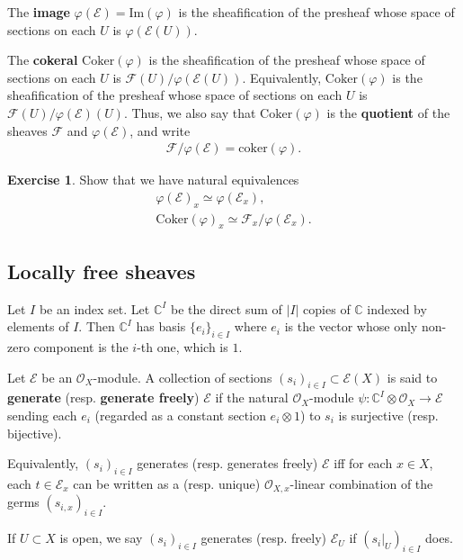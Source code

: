 \documentclass[12pt,a4paper,notitlepage]{article}
\theoremstyle{definition}
\newtheorem{exe}[df]{Exercise}
\theoremstyle{plain}
\newcommand{\scr}{\mathscr}
\newcommand{\coker}{\mathrm{coker}}
\newcommand{\Cbb}{\mathbb C}
\newcommand{\Coker}{\mathrm{Coker}}
\newcommand{\Imag}{\mathrm{Im}}
\numberwithin{equation}{section}
\begin{document}
The \textbf{image} $\varphi(\scr E)=\Imag(\varphi)$ is the sheafification of the presheaf whose space of sections on each $U$ is $\varphi(\scr E(U))$.


The \textbf{cokeral} $\Coker(\varphi)$ is the sheafification of the presheaf whose space of sections on each $U$ is $\scr F(U)/\varphi(\scr E(U))$. Equivalently, $\Coker(\varphi)$ is the sheafification of the presheaf whose space of sections on each $U$ is $\scr F(U)/\varphi(\scr E)(U)$. Thus, we also say that $\Coker(\varphi)$ is the \textbf{quotient} of the sheaves $\scr F$ and $\varphi(\scr E)$, and write
\begin{align}
\scr F/\varphi(\scr E)=\coker(\varphi).	
\end{align}



\begin{exe}
	Show that we have natural equivalences
	\begin{gather}
		\varphi(\scr E)_x\simeq\varphi(\scr E_x),\\
		\Coker(\varphi)_x	\simeq \scr F_x/\varphi(\scr E_x).
	\end{gather}
\end{exe}


\subsection{Locally free sheaves}


Let $I$ be an index set. Let $\Cbb^I$ be the direct sum of  $|I|$ copies of $\Cbb$ indexed by elements of $I$. Then $\Cbb^I$ has basis $\{e_i\}_{i\in I}$ where $e_i$ is the vector whose only non-zero component is the $i$-th one, which is $1$.

Let $\scr E$ be an $\scr O_X$-module. A collection of sections $(s_i)_{i\in I}\subset\scr E(X)$ is said to \textbf{generate} (resp. \textbf{generate freely}) $\scr E$ if the natural $\scr O_X$-module $\psi:\Cbb^I\otimes\scr O_X\rightarrow\scr E$ sending each $e_i$ (regarded as a constant section $e_i\otimes 1$) to $s_i$ is surjective (resp. bijective).

Equivalently, $(s_i)_{i\in I}$ generates (resp. generates freely) $\scr E$ iff for each $x\in X$, each $t\in\scr E_x$ can be written as a (resp. unique) $\scr O_{X,x}$-linear combination of the germs $(s_{i,x})_{i\in I}$.

If $U\subset X$ is open, we say $(s_i)_{i\in I}$ generates (resp. freely) $\scr E_U$ if $(s_i|_U)_{i\in I}$ does.
\end{document}
